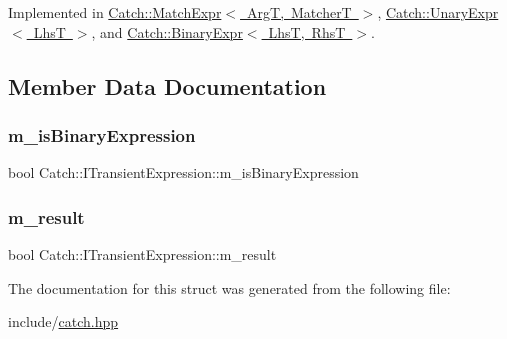 Implemented in \mbox{\hyperlink{class_catch_1_1_match_expr_ad3e41adb597750b2219bb37e51185629}{Catch\+::\+Match\+Expr$<$ Arg\+T, Matcher\+T $>$}}, \mbox{\hyperlink{class_catch_1_1_unary_expr_aaabf30455a996c80675c0f388a6e4110}{Catch\+::\+Unary\+Expr$<$ Lhs\+T $>$}}, and \mbox{\hyperlink{class_catch_1_1_binary_expr_af998022712d4bd3e4fc7ab9b8a38b445}{Catch\+::\+Binary\+Expr$<$ Lhs\+T, Rhs\+T $>$}}.



\subsection{Member Data Documentation}
\mbox{\label{struct_catch_1_1_i_transient_expression_a75ce48da824d514d08152d396abb28d8}} 
\subsubsection{\texorpdfstring{m\_isBinaryExpression}{m\_isBinaryExpression}}
{\footnotesize\ttfamily bool Catch\+::\+I\+Transient\+Expression\+::m\+\_\+is\+Binary\+Expression}

\mbox{\label{struct_catch_1_1_i_transient_expression_a4646e2b5e0156e913653ec3b9b60c942}} 
\subsubsection{\texorpdfstring{m\_result}{m\_result}}
{\footnotesize\ttfamily bool Catch\+::\+I\+Transient\+Expression\+::m\+\_\+result}



The documentation for this struct was generated from the following file\+:\begin{DoxyCompactItemize}
\item 
include/\mbox{\hyperlink{catch_8hpp}{catch.\+hpp}}\end{DoxyCompactItemize}
